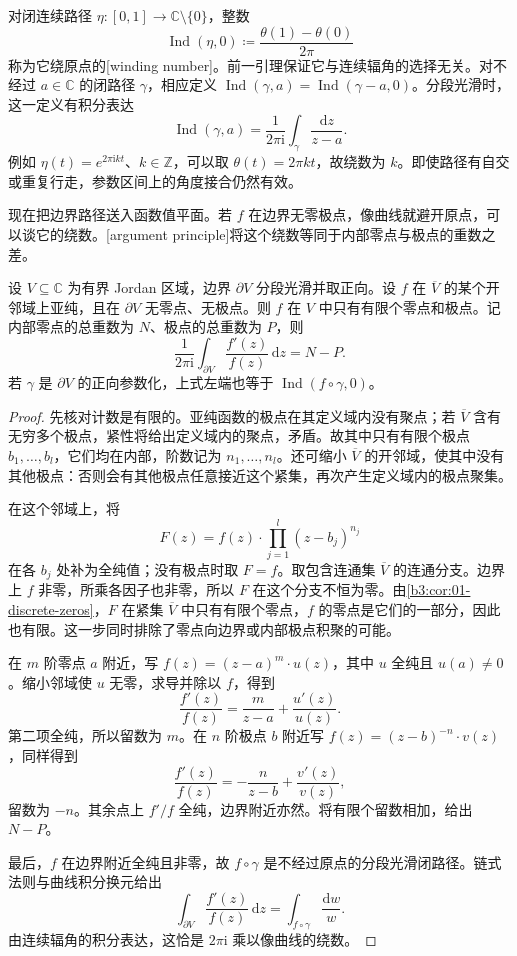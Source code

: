对闭连续路径 \(\eta:[0,1]\to\mathbb C\setminus\{0\}\)，整数
\[
 \operatorname{Ind}(\eta,0)\coloneqq
 \frac{\theta(1)-\theta(0)}{2\pi}
\]
称为它绕原点的[winding number]。前一引理保证它与连续辐角的选择无关。对不经过 \(a\in\mathbb C\) 的闭路径 \(\gamma\)，相应定义 \(\operatorname{Ind}(\gamma,a)=\operatorname{Ind}(\gamma-a,0)\)。分段光滑时，这一定义有积分表达
\[
 \operatorname{Ind}(\gamma,a)
 =\frac1{2\pi\mathrm{i}}\int_\gamma\frac{\mathrm{d}z}{z-a}.
\]
例如 \(\eta(t)=e^{2\pi\mathrm{i}kt}\)、\(k\in\mathbb Z\)，可以取 \(\theta(t)=2\pi kt\)，故绕数为 \(k\)。即使路径有自交或重复行走，参数区间上的角度接合仍然有效。

\ProseParagraphBreak

现在把边界路径送入函数值平面。若 \(f\) 在边界无零极点，像曲线就避开原点，可以谈它的绕数。[argument principle]将这个绕数等同于内部零点与极点的重数之差。

\begin{theorem}[辐角原理]\label{b3:thm:03-argument-principle}
设 \(V\subseteq\mathbb C\) 为有界 Jordan 区域，边界 \(\partial V\) 分段光滑并取正向。设 \(f\) 在 \(\overline V\) 的某个开邻域上亚纯，且在 \(\partial V\) 无零点、无极点。则 \(f\) 在 \(V\) 中只有有限个零点和极点。记内部零点的总重数为 \(N\)、极点的总重数为 \(P\)，则
\[
 \frac1{2\pi\mathrm{i}}\int_{\partial V}\frac{f'(z)}{f(z)}\,\mathrm{d}z=N-P.
\]
若 \(\gamma\) 是 \(\partial V\) 的正向参数化，上式左端也等于 \(\operatorname{Ind}(f\circ\gamma,0)\)。
\end{theorem}
\begin{proof}
先核对计数是有限的。亚纯函数的极点在其定义域内没有聚点；若 \(\overline V\) 含有无穷多个极点，紧性将给出定义域内的聚点，矛盾。故其中只有有限个极点 \(b_1,\ldots,b_l\)，它们均在内部，阶数记为 \(n_1,\ldots,n_l\)。还可缩小 \(\overline V\) 的开邻域，使其中没有其他极点：否则会有其他极点任意接近这个紧集，再次产生定义域内的极点聚集。

在这个邻域上，将
\[
 F(z)=f(z)\cdot\prod_{j=1}^l(z-b_j)^{n_j}
\]
在各 \(b_j\) 处补为全纯值；没有极点时取 \(F=f\)。取包含连通集 \(\overline V\) 的连通分支。边界上 \(f\) 非零，所乘各因子也非零，所以 \(F\) 在这个分支不恒为零。由\cref{b3:cor:01-discrete-zeros}，\(F\) 在紧集 \(\overline V\) 中只有有限个零点，\(f\) 的零点是它们的一部分，因此也有限。这一步同时排除了零点向边界或内部极点积聚的可能。

在 \(m\) 阶零点 \(a\) 附近，写 \(f(z)=(z-a)^m\cdot u(z)\)，其中 \(u\) 全纯且 \(u(a)\ne0\)。缩小邻域使 \(u\) 无零，求导并除以 \(f\)，得到
\[
 \frac{f'(z)}{f(z)}=\frac{m}{z-a}+\frac{u'(z)}{u(z)}.
\]
第二项全纯，所以留数为 \(m\)。在 \(n\) 阶极点 \(b\) 附近写 \(f(z)=(z-b)^{-n}\cdot v(z)\)，同样得到
\[
 \frac{f'(z)}{f(z)}=-\frac{n}{z-b}+\frac{v'(z)}{v(z)},
\]
留数为 \(-n\)。其余点上 \(f'/f\) 全纯，边界附近亦然。将有限个留数相加，给出 \(N-P\)。

最后，\(f\) 在边界附近全纯且非零，故 \(f\circ\gamma\) 是不经过原点的分段光滑闭路径。链式法则与曲线积分换元给出
\[
 \int_{\partial V}\frac{f'(z)}{f(z)}\,\mathrm{d}z
 =\int_{f\circ\gamma}\frac{\mathrm{d}w}{w}.
\]
由连续辐角的积分表达，这恰是 \(2\pi\mathrm{i}\) 乘以像曲线的绕数。
\end{proof}

